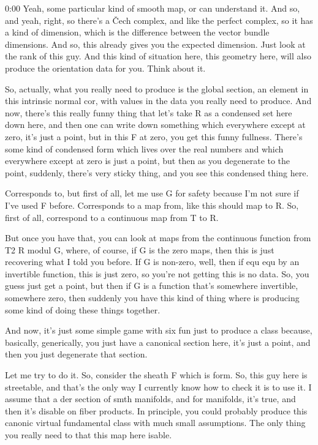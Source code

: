 \begin{unfinished}{0:00}
Yeah, some particular kind of smooth map, or can understand it. And so, and yeah, right, so there's a Čech complex, and like the perfect complex, so it has a kind of dimension, which is the difference between the vector bundle dimensions. And so, this already gives you the expected dimension. Just look at the rank of this guy. And this kind of situation here, this geometry here, will also produce the orientation data for you. Think about it.

So, actually, what you really need to produce is the global section, an element in this intrinsic normal cor, with values in the data you really need to produce. And now, there's this really funny thing that let's take R as a condensed set here down here, and then one can write down something which everywhere except at zero, it's just a point, but in this F at zero, you get this funny fullness. There's some kind of condensed form which lives over the real numbers and which everywhere except at zero is just a point, but then as you degenerate to the point, suddenly, there's very sticky thing, and you see this condensed thing here.

Corresponds to, but first of all, let me use G for safety because I'm not sure if I've used F before. Corresponds to a map from, like this should map to R. So, first of all, correspond to a continuous map from T to R.

But once you have that, you can look at maps from the continuous function from T2 R modul G, where, of course, if G is the zero maps, then this is just recovering what I told you before. If G is non-zero, well, then if equ equ by an invertible function, this is just zero, so you're not getting this is no data. So, you guess just get a point, but then if G is a function that's somewhere invertible, somewhere zero, then suddenly you have this kind of thing where is producing some kind of doing these things together.

And now, it's just some simple game with six fun just to produce a class because, basically, generically, you just have a canonical section here, it's just a point, and then you just degenerate that section.

Let me try to do it. So, consider the sheath F which is form. So, this guy here is streetable, and that's the only way I currently know how to check it is to use it. I assume that a der section of smth manifolds, and for manifolds, it's true, and then it's disable on fiber products. In principle, you could probably produce this canonic virtual fundamental class with much small assumptions. The only thing you really need to that this map here isable.


\end{unfinished}
